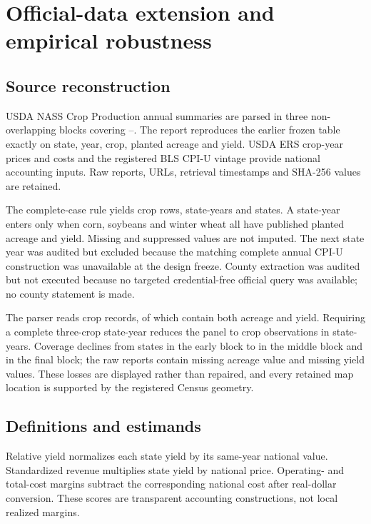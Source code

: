 \section{Official-data extension and empirical robustness}

\subsection{Source reconstruction}
USDA NASS Crop Production annual summaries are parsed in three non-overlapping blocks covering \EmpiricalStartYear--\EmpiricalEndYear{}. The \EmpiricalEndYear{} report reproduces the earlier frozen table exactly on state, year, crop, planted acreage and yield. USDA ERS crop-year prices and costs and the registered BLS CPI-U vintage provide national accounting inputs. Raw reports, URLs, retrieval timestamps and SHA-256 values are retained.

The complete-case rule yields \NCropRows{} crop rows, \NStateYears{} state-years and \NStates{} states. A state-year enters only when corn, soybeans and winter wheat all have published planted acreage and yield. Missing and suppressed values are not imputed. The next state year was audited but excluded because the matching complete annual CPI-U construction was unavailable at the design freeze. County extraction was audited but not executed because no targeted credential-free official query was available; no county statement is made.

The parser reads \ParsedCropRows{} crop records, of which \NonmissingCropRows{} contain both acreage and yield. Requiring a complete three-crop state-year reduces the panel to \NCropRows{} crop observations in \NStateYears{} state-years. Coverage declines from \EarlyCoverageStates{} states in the early block to \MiddleCoverageStates{} in the middle block and \FinalCoverageStates{} in the final block; the raw reports contain \MissingAcreageRows{} missing acreage value and \MissingYieldRows{} missing yield values. These losses are displayed rather than repaired, and every retained map location is supported by the registered Census geometry.

\subsection{Definitions and estimands}
Relative yield normalizes each state yield by its same-year national value. Standardized revenue multiplies state yield by national price. Operating- and total-cost margins subtract the corresponding national cost after real-dollar conversion. These scores are transparent accounting constructions, not local realized margins.

